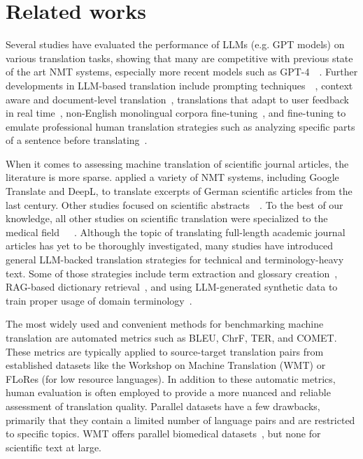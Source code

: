 \section{Related works}
Several studies have evaluated the performance of LLMs (e.g. GPT models) on various translation tasks, showing that many are competitive with previous state of the art NMT systems, especially more recent models such as GPT-4~\citep{hendy2023good}~\citep{jiao2023chatgpt}. Further developments in LLM-based translation include prompting techniques~\citep{vilar2022prompting}~\citep{zhang2023prompting}, context aware and document-level translation~\citep{wang2023document}, translations that adapt to user feedback in real time~\citep{moslem2023adaptive}, non-English monolingual corpora fine-tuning~\citep{xu2023paradigm}, and fine-tuning to emulate professional human translation strategies such as analyzing specific parts of a sentence before translating~\citep{he2024exploring}.

When it comes to assessing machine translation of scientific journal articles, the literature is more sparse. \citet{zulfiqar2018machine} applied a variety of NMT systems, including Google Translate and DeepL, to translate excerpts of German scientific articles from the last century. Other studies focused on scientific abstracts~\citep{tongpoon2020google}~\citep{wei2017machine}. To the best of our knowledge, all other studies on scientific translation were specialized to the medical field~\citep{soto2019neural}~\citep{daniele2019performance}~\citep{sebo2024performance}. Although the topic of translating full-length academic journal articles has yet to be thoroughly investigated, many studies have introduced general LLM-backed translation strategies for technical and terminology-heavy text. Some of those strategies include term extraction and glossary creation~\citep{kim2024efficient}, RAG-based dictionary retrieval~\citep{zheng2024fine}, and using LLM-generated synthetic data to train proper usage of domain terminology~\citep{moslem-etal-2023-domain}. 

The most widely used and convenient methods for benchmarking machine translation are automated metrics such as BLEU, ChrF, TER, and COMET. These metrics are typically applied to source-target translation pairs from established datasets like the Workshop on Machine Translation (WMT) or FLoRes (for low resource languages). In addition to these automatic metrics, human evaluation is often employed to provide a more nuanced and reliable assessment of translation quality. Parallel datasets have a few drawbacks, primarily that they contain a limited number of language pairs and are restricted to specific topics. WMT offers parallel biomedical datasets~\citep{neves-EtAl:2022:WMT}, but none for scientific text at large. 

